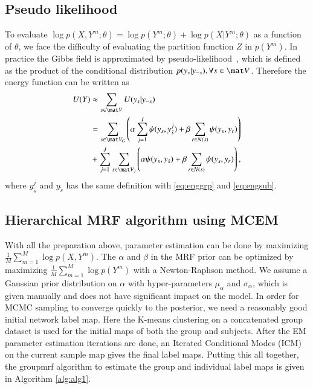 \documentclass[final,authoryear,5p,twocolumn]{elsarticle}
\begin{document}
\subsection{Pseudo likelihood} 
To evaluate $\log p(X,Y^m;\theta) = \log p(Y^m;\theta) + \log p(X|Y^m;\theta)$
as a function of $\theta$, we face the difficulty of evaluating the partition
function $Z$ in $p(Y^m)$.  In practice the Gibbs field is approximated by
pseudo-likelihood~\citep{besag_spatial_1974}, which is defined as the product of the conditional
distribution $p(y_s|y_{-s}), \forall s \in \mat V$. Therefore the energy
function can be written as
\begin{align*}
U(Y) &\approx  \sum_{s\in\mat V} U(y_s | y_{-s}) \\
&= \sum_{s\in\mat V_G} \left ( \alpha \sum_{j=1}^J \psi(y_s,y_{\tilde s}^j) +\beta\sum_{r\in N(s)} \psi(y_s, y_r) \right ) \\
&+ \sum_{j=1}^J \sum_{s\in\mat V_j} \left (\alpha \psi(y_s, y_{\tilde s}) + \beta \sum_{r\in N(s)} \psi(y_s, y_r) \right ),
\end{align*}
where $y_{\tilde s}^j$ and $y_{\tilde s}$ has the same definition with \eqref{eq:enggrp} and \eqref{eq:engsub}.

\subsection{Hierarchical MRF algorithm using MCEM} 
With all the preparation above, parameter estimation can be done by maximizing
$\frac{1}{M}\sum_{m=1}^M\log p (X, Y^m)$. The $\alpha$ and $\beta$ in the MRF
prior can be optimized by maximizing $\frac{1}{M}\sum_{m=1}^M\log p (Y^m)$ with
a Newton-Raphson method. We assume a Gaussian prior distribution on $\alpha$
with hyper-parameters $\mu_{\alpha}$ and $\sigma_{\alpha}$, which is given
manually and does not have significant impact on the model. In order for MCMC
sampling to converge quickly to the posterior, we need a reasonably good initial
network label map. Here the K-means clustering on a concatenated group dataset
is used for the initial maps of both the group and subjects. After the EM
parameter estimation iterations are done, an Iterated Conditional Modes (ICM) on
the current sample map gives the final label maps. Putting this all together,
the \textsf{groupmrf} algorithm to estimate the group and individual label maps
is given in Algorithm \ref{alg:alg1}.
\end{document}
